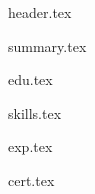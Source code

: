 \documentclass[11pt, a4paper]{extarticle}
\begin{document}
	{header.tex}

	{summary.tex}

	{edu.tex}

	{skills.tex}

	{exp.tex}

	{cert.tex}
\end{document}
